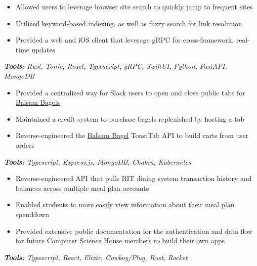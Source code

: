 \begin{itemize}
\item Allowed users to leverage browser site search to quickly jump to frequent sites
\item Utilized keyword-based indexing, as well as fuzzy search for link resolution
\item Provided a web and iOS client that leverage gRPC for cross-framework, real-time updates
\end{itemize}
\textit{\textbf{Tools:} Rust, Tonic, React, Typescript, gRPC, SwiftUI, Python, FastAPI, MongoDB}

\divider

\begin{itemize}
\item Provided a centralized way for Slack users to open and close public tabs for \href{https://www.balsambagels.com}{Balsam Bagels}
\item Maintained a credit system to purchase bagels replenished by hosting a tab
\item Reverse-engineered the \href{https://www.balsambagels.com}{Balsam Bagel} ToastTab API to build carts from user orders
\end{itemize}
\textit{\textbf{Tools:} Typescript, Express.js, MongoDB, Chakra, Kubernetes}

\divider

\begin{itemize}
\item Reverse-engineered API that pulls RIT dining system transaction history and balances across multiple meal plan accounts
\item Enabled students to more easily view information about their meal plan spenddown
\item Provided extensive public documentation for the authentication and data flow for future Computer Science House members to build their own apps
\end{itemize}
\textit{\textbf{Tools:} Typescript, React, Elixir, Cowboy/Plug, Rust, Rocket}
